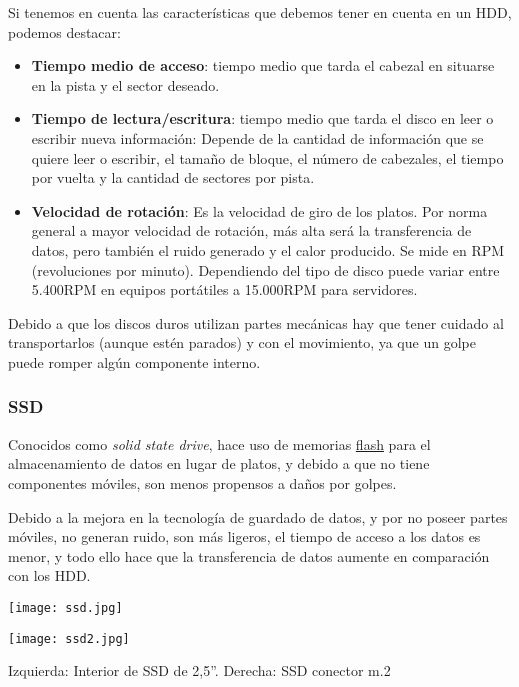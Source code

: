 
Si tenemos en cuenta las características que debemos tener en cuenta en un HDD, podemos destacar:

\begin{itemize}
    \item \textbf{Tiempo medio de acceso}: tiempo medio que tarda el cabezal en situarse en la pista y el sector deseado.
    \item \textbf{Tiempo de lectura/escritura}: tiempo medio que tarda el disco en leer o escribir nueva información: Depende de la cantidad de información que se quiere leer o escribir, el tamaño de bloque, el número de cabezales, el tiempo por vuelta y la cantidad de sectores por pista.
    \item \textbf{Velocidad de rotación}: Es la velocidad de giro de los platos. Por norma general a mayor velocidad de rotación, más alta será la transferencia de datos, pero también el ruido generado y el calor producido. Se mide en RPM (revoluciones por minuto). Dependiendo del tipo de disco puede variar entre 5.400RPM en equipos portátiles a 15.000RPM para servidores.
\end{itemize}

Debido a que los discos duros utilizan partes mecánicas hay que tener cuidado al transportarlos (aunque estén parados) y con el movimiento, ya que un golpe puede romper algún componente interno.


\subsubsection{SSD}

Conocidos como \textit{solid state drive}, hace uso de memorias \href{https://es.wikipedia.org/wiki/Memoria_flash}{flash} para el almacenamiento de datos en lugar de platos, y debido a que no tiene componentes móviles, son menos propensos a daños por golpes.

Debido a la mejora en la tecnología de guardado de datos, y por no poseer partes móviles, no generan ruido, son más ligeros, el tiempo de acceso a los datos es menor, y todo ello hace que la transferencia de datos aumente en comparación con los HDD.

{
    \begin{minipage}{0.48\linewidth}
        \texttt{[image: ssd.jpg]}
    \end{minipage}
    \hfill
    \begin{minipage}{0.48\linewidth}
        \texttt{[image: ssd2.jpg]}
    \end{minipage}
    \vspace{-10pt}
    \begin{center}
       \footnotesize{Izquierda: Interior de SSD de 2,5”. Derecha: SSD conector m.2}
    \end{center}
}

